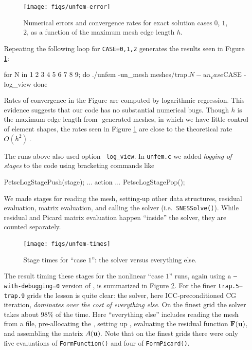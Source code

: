 \begin{figure}
\texttt{[image: figs/unfem-error]}
\caption{Numerical errors and convergence rates for exact solution cases $0$, $1$, $2$, as a function of the maximum mesh edge length $h$.}
\label{fig:un:unfem-error}
\end{figure}

Repeating the following loop for \texttt{CASE=0,1,2} generates the results seen in Figure \ref{fig:un:unfem-error}:
\begin{code}
for N in 1 2 3 4 5 6 7 8 9; do
    ./unfem -un_mesh meshes/trap.$N -un_case $CASE -log_view
done
\end{code}
Rates of convergence in the Figure are computed by logarithmic regression.
This evidence suggests that our code has no substantial numerical bugs.  Though $h$ is the maximum edge length from \Triangle-generated meshes, in which we have little control of element shapes, the rates seen in Figure \ref{fig:un:unfem-error} are close to the theoretical rate $O(h^2)$ \citep{Braess2007}.

The runs above also used option \texttt{-log\_view}.  In \texttt{unfem.c} we added \emph{logging of stages} to the code using bracketing \PETSc commands like
\begin{code}
    PetscLogStagePush(stage);
    ... action ...
    PetscLogStagePop();
\end{code}
We made stages for reading the mesh, setting-up other data structures, residual evaluation, matrix evaluation, and calling the solver (i.e.~\texttt{SNESSolve()}).  While residual and Picard matrix evaluation happen ``inside'' the solver, they are counted separately.

\begin{figure}
\texttt{[image: figs/unfem-times]}
\caption{Stage times for ``case $1$'': the solver versus everything else.}
\label{fig:un:unfem-times}
\end{figure}

The result timing these stages for the nonlinear ``case $1$'' runs, again using a \texttt{--with-debugging=0} version of \PETSc, is summarized in Figure \ref{fig:un:unfem-times}.  For the finer \texttt{trap.5}--\texttt{trap.9} grids the lesson is quite clear: the solver, here ICC-preconditioned CG iteration, \emph{dominates over the cost of everything else}.  On the finest grid the solver takes about $98\%$ of the time.  Here ``everything else'' includes reading the mesh from a file, pre-allocating the \pMat, setting up \pVecs, evaluating the residual function $\mathbf{F}(\mathbf{u})$, and assembling the matrix $A(\mathbf{u})$.  Note that on the finest grids there were only five evaluations of \texttt{FormFunction()} and four of \texttt{FormPicard()}.

